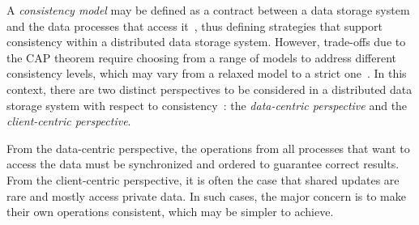 

A {\it consistency model} may be defined as a contract between a data storage system and the data processes that access it~\cite{tanenbaum:2007}, 
{\al thus defining strategies that support} consistency within a distributed data storage system. However, trade-offs due to the CAP theorem require choosing from a range of models to address different consistency levels, which may vary from a relaxed model to a strict one~\cite{bermbach2013consistency}. 
In this context, there are two distinct perspectives to be considered in a distributed data storage system with respect to consistency~\cite{tanenbaum:2007}: 
the \textit{data-centric perspective} and the \textit{client-centric perspective}.

From the data-centric perspective, the operations from all processes that want to access the data must be synchronized and ordered to guarantee correct results. From the client-centric perspective, it is often the case that shared updates are rare and mostly access private data. In such cases, the major concern is to make their own operations consistent, which may be simpler to achieve.

